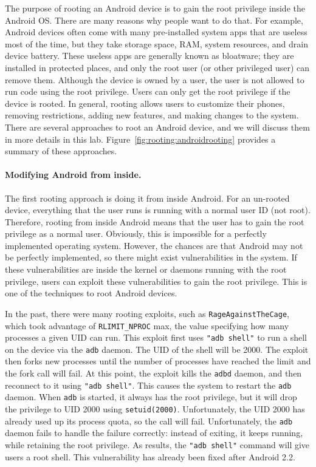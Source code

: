The purpose of rooting an Android device is to gain the root privilege
inside the Android OS. There are many reasons why people want to do that.
For example, Android devices often come with many pre-installed system apps that are
useless most of the time, but they take storage space, RAM,
system resources, and drain device battery. These useless
apps are generally known as bloatware; they are installed
in protected places, and only the root user (or other privileged user) 
can remove them. Although the device is owned by a user,
the user is not allowed to run code using the root privilege. 
Users can only get the root privilege if the device is rooted. 
In general, rooting allows users to customize their phones, removing restrictions,
adding new features, and making changes to the system. There are several
approaches to root an Android device, and we will discuss them in more
details in this lab. Figure~\ref{fig:rooting:androidrooting} provides a summary of these
approaches.


\paragraph{Modifying Android from inside.}
The first rooting approach is doing it from inside Android. For an un-rooted device, everything that
the user runs is running with a normal user ID (not root). Therefore,
rooting from inside Android means that the user has to gain the root
privilege as a normal user. Obviously, this is impossible for 
a perfectly implemented operating system. However, the chances are that
Android may not be perfectly implemented, so there might exist
vulnerabilities in the system. If these vulnerabilities are inside the kernel or daemons 
running with the root privilege, users can exploit these vulnerabilities to
gain the root privilege. This is one of the techniques to root Android
devices. 

In the past, there were many rooting exploits, such as
\texttt{RageAgainstTheCage}, which took advantage of 
\texttt{RLIMIT\_NPROC} max, the value specifying how many processes a given UID can run. 
This exploit first uses \texttt{"adb  shell"} to run a 
shell on the device via the \texttt{adb} daemon. The UID of the shell will
be 2000. The exploit then forks new processes until the number of processes
have reached the limit and the fork call will fail. 
At this point, the exploit kills the \texttt{adbd} daemon, and then
reconnect to it using \texttt{"adb shell"}. This causes the system to  
restart the \texttt{adb} daemon. When \texttt{adb} is started, it always
has the root privilege, but it will drop the privilege to UID 2000 using   
\texttt{setuid(2000)}. Unfortunately, the UID 2000 has already used up its 
process quota, so the call will fail. Unfortunately, the \texttt{adb}
daemon fails to handle the failure correctly: instead of exiting, it keeps
running, while retaining the root privilege. As results, the 
\texttt{"adb shell"} command will give users a root shell. 
This vulnerability has already been fixed after Android 2.2. 



